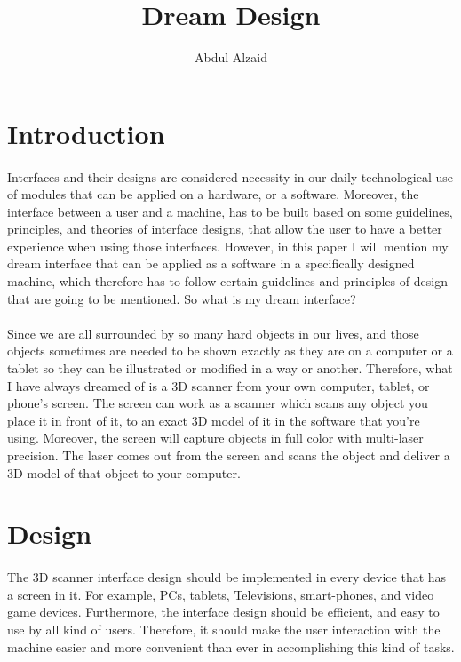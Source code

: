 \documentclass[12pt, oneside]{article}   	%
\title{Dream Design}
\author{Abdul Alzaid}
\begin{document}
\maketitle
\section{Introduction}
\doublespacing
\paragraph{}
Interfaces and their designs are considered necessity in our daily technological use of modules that can be applied on a hardware, or a software.  Moreover, the interface between a user and a machine, has to be built based on some guidelines, principles, and theories of interface designs, that allow the user to have a better experience when using those interfaces.  However, in this paper I will mention my dream interface that can be applied as a software in a specifically designed machine, which therefore has to follow certain guidelines and principles of design that are going to be mentioned. So what is my dream interface?
\paragraph{}
Since we are all surrounded by so many hard objects in our lives, and those objects sometimes are needed to be shown exactly as they are on a computer or a tablet so they can be illustrated or modified in a way or another. Therefore, what I have always dreamed of is a 3D scanner from your own computer, tablet, or phone's screen. The screen can work as a scanner which scans any object you place it in front of it, to an exact 3D model of it in the software that you're using. Moreover, the screen will capture objects in full color with multi-laser precision. The laser comes out from the screen and scans the object and deliver a 3D model of that object to your computer. 
\section{Design}
\paragraph{}
The 3D scanner interface design should be implemented in every device that has a screen in it.  For example, PCs, tablets, Televisions, smart-phones, and video game devices. Furthermore, the interface design should be efficient, and easy to use by all kind of users. Therefore, it should make the user interaction with the machine easier and more convenient than ever in accomplishing this kind of tasks. 
\end{document}
